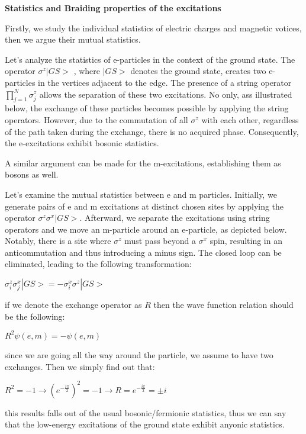 \documentclass[12pt]{report}
\begin{document}
	
	\begin{minipage}{1 \textwidth}
 
		\textbf{Statistics and Braiding properties of the excitations}\newline
		
		Firstly, we study the individual statistics of electric charges and magnetic votices, then we argue their mutual statistics.\newline
		
		Let's analyze the statistics of e-particles in the context of the ground state. The operator $\sigma^z|GS>$ , where $|GS>$ denotes the ground state, creates two e-particles in the vertices adjacent to the edge. The presence of a string operator $\prod_{j=1}^{N} \sigma_j^z$ allows the separation of these two excitations. No only, ass illustrated below, the exchange of these particles becomes possible by applying the string operators. However, due to the commutation of all $\sigma^z$ with each other, regardless of the path taken during the exchange, there is no acquired phase. Consequently, the e-excitations exhibit bosonic statistics. \newline
		
		
		A similar argument can be made for the m-excitations, establishing them as bosons as well.
		
		Let's examine the mutual statistics between e and m particles. Initially, we generate pairs of e and m excitations at distinct chosen sites by applying the operator $\sigma^z\sigma^x|GS>$. Afterward, we separate the excitations using string operators and we move an m-particle around an e-particle, as depicted below. Notably, there is a site where $\sigma^z$ must pass beyond a $\sigma^x$ spin, resulting in an anticommutation and thus introducing a minus sign. The closed loop can be eliminated, leading to the following transformation:
		
		\begin{center}
			$\sigma_i^z\sigma_j^x|GS> = - \sigma_i^x\sigma^z|GS>$
		\end{center}
		
		if we denote the exchange operator as $R$ then the wave function relation should be the following:
		
		\begin{center}
			$R^2\psi(e,m) = - \psi(e,m)$
		\end{center}
		
		since we are going all the way around the particle, we assume to have two exchanges. Then we simply find out that:
		
		\begin{center}
			$R^2 = - 1 \rightarrow ( e^{-\frac{i\pi}{2}})^2 = - 1  \rightarrow R = e^{-\frac{i\pi}{2}} = \pm i $
		\end{center}
		
		this results falls out of the usual bosonic/fermionic statistics, thus we can say that the low-energy excitations of the ground state exhibit anyonic statistics.\newline
		
	\end{minipage}
	
\end{document}
